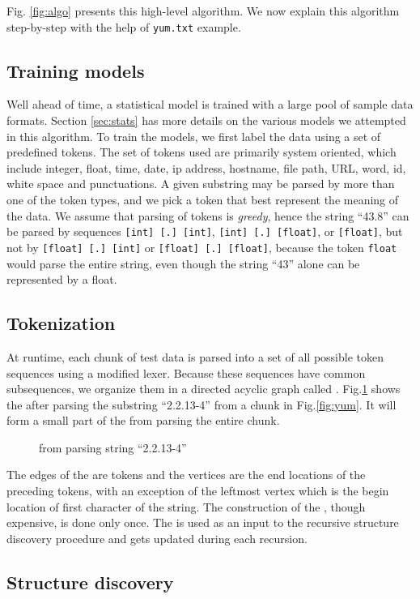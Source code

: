 Fig. \ref{fig:algo} presents this high-level algorithm. We now explain
this algorithm step-by-step with the help of {\tt yum.txt} example.

\subsection{Training models}
Well ahead of time, a statistical model is trained with
a large pool of sample data formats. Section \ref{sec:stats} has more details
on the various models we attempted in this algorithm. To train the models,
we first label the data using a set of predefined tokens. The set of tokens
used are primarily system oriented, which include
integer, float, time, date, ip address, hostname, file path, URL, 
word, id, white space and punctuations. 
A given substring may be parsed by more than one of the token
types, and we pick a token that best represent the meaning of the data.
We assume that parsing of tokens is {\em greedy}, hence
the string ``43.8'' can be parsed by sequences 
{\tt [int] [.] [int]}, {\tt [int] [.] [float]}, or {\tt [float]},
but not by {\tt [float] [.] [int]} or {\tt [float] [.] [float]},
because the token {\tt float} would parse the entire string, even though
the string ``43'' alone can be represented by a float.

\subsection{Tokenization}
At runtime, each chunk of test data is parsed into a set of all possible 
token sequences using a modified lexer. Because these sequences have
common subsequences, we organize them in a directed acyclic graph
called \seqset. Fig.\ref{fig:seqset} shows the \seqset{} after parsing 
the substring ``2.2.13-4'' from a chunk in Fig.\ref{fig:yum}. It will
form a small part of the \seqset from parsing the entire chunk.

\begin{figure}[th]
\begin{center}
\end{center}
\caption{\seqset{} from parsing string ``2.2.13-4''}\label{fig:seqset}
\end{figure}

The edges of the \seqset{} are tokens and the vertices are the end locations
of the preceding tokens, with an exception of the leftmost vertex which
is the begin location of first character of the string.
The construction of the \seqset, though expensive, is done only once.
The \seqset{} is used as an input to the recursive structure discovery procedure
and gets updated during each recursion.

\subsection{Structure discovery}
